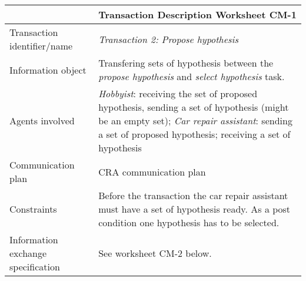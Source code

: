 \noindent
\begin{tabular}{%
       |>{\colleft}p{3cm}%
       |>{\colleft}p{8.5cm}|}
\hline
{\bf Communication model} &
   {\bf Transaction Description Worksheet CM-1} \\
\hline
\hline
\sc Transaction identifier/name &
	\emph{Transaction 2: Propose hypothesis} \\

\hline
\sc Information object &
	Transfering sets of hypothesis between the \emph{propose hypothesis} and \emph{select hypothesis} task. \\
\hline
\sc Agents involved &
	\emph{Hobbyist}: receiving the set of proposed hypothesis, sending a set of hypothesis (might be an empty set); \newline
	\emph{Car repair assistant}: sending a set of proposed hypothesis; receiving a set of hypothesis\\
\hline
\sc Communication plan &
	CRA communication plan\\

\hline
\sc Constraints &
	Before the transaction the car repair assistant must have a set of hypothesis ready. As a post condition one hypothesis has to be selected.\\

\hline
\sc Information exchange specification &
	See worksheet CM-2 below.\\

\hline
\end{tabular}


